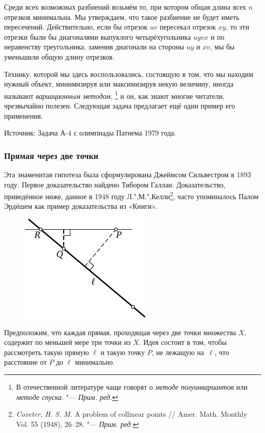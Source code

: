 \documentclass[twoside]{book}
\begin{document}
Среди всех возможных разбиений возьмём то, при котором общая длина всех $n$ отрезков минимальна.
Мы утверждаем, что такое разбиение не будет иметь пересечений.
Действительно, если бы отрезок $uv$ пересекал отрезок $xy$, то эти отрезки были бы диагоналями выпуклого четырёхугольника $uyvx$ %
и по неравенству треугольника, заменив диагонали на стороны $uy$ и $xv$, мы бы уменьшили общую длину отрезков.
\heart

Технику, которой мы здесь воспользовались, состоящую в том, что мы находим нужный объект, минимизируя или максимизируя некую величину, иногда называют \emph{вариационным методом},%
\footnote{В отечественной литературе чаще говорят о \emph{методе полуинвариантов} или \emph{методе спуска}. "--- \emph{Прим. ред.}}
и он, как знают многие читатели, чрезвычайно полезен.
Следующая задача предлагает ещё один пример его применения.

\medskip
{\small 
Источник: Задача А-4 с олимпиады Патнема 1979 года.

}


\subsubsection*{Прямая через две точки}%

Эта знаменитая гипотеза была сформулирована Джеймсом Сильвестром в 1893 году.
Первое доказательство найдено Тибором Галлаи. %
Доказательство, приведённое ниже, данное в 1948 году Л.",М.",Келли\footnote{
\emph{Coxeter, H. S. M.} A problem of collinear points /\!/ {Amer. Math. Monthly} Vol. 55 (1948), 26--28. "--- \emph{Прим. ред.}}, 
часто упоминалось Палом Эрдёшем как пример доказательства из «Книги».

\begin{figure}[ht!]
\centering
\includegraphics[scale=1.3]{mp/wink-12}
\end{figure}


Предположим, что каждая прямая, проходящая через две точки множества $X$, содержит по меньшей мере три точки из $X$.
Идея состоит в том, чтобы рассмотреть такую прямую $\ell$ и такую точку $P$, не лежащую на~$\ell$, что расстояние от $P$ до $\ell$ минимально.
\end{document}
